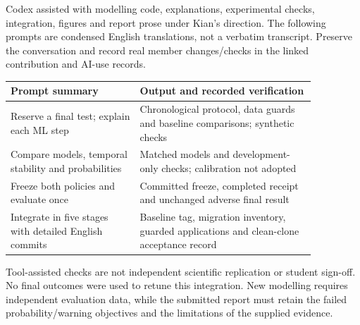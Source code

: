 Codex assisted with modelling code, explanations, experimental checks, integration, figures and report prose under Kian's direction. The following prompts are condensed English translations, not a verbatim transcript. Preserve the conversation and record real member changes/checks in the linked contribution and AI-use records.

\begin{center}\small\setlength{\tabcolsep}{3pt}
\begin{tabular}{p{0.361\linewidth}p{0.499\linewidth}}
\hline
Prompt summary & Output and recorded verification \\ \hline
Reserve a final test; explain each ML step & Chronological protocol, data guards and baseline comparisons; synthetic checks \\
Compare models, temporal stability and probabilities & Matched models and development-only checks; calibration not adopted \\
Freeze both policies and evaluate once & Committed freeze, completed receipt and unchanged adverse final result \\
Integrate in five stages with detailed English commits & Baseline tag, migration inventory, guarded applications and clean-clone acceptance record \\
\hline\end{tabular}\end{center}

Tool-assisted checks are not independent scientific replication or student sign-off. No final outcomes were used to retune this integration. New modelling requires independent evaluation data, while the submitted report must retain the failed probability/warning objectives and the limitations of the supplied evidence.
